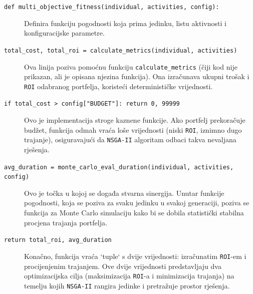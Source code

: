 \begin{description}
    \item[\texttt{def multi\_objective\_fitness(individual, activities, config):}] Definira funkciju pogodnosti koja prima jedinku, listu aktivnosti i konfiguracijske parametre.
    \item[\texttt{total\_cost, total\_roi = calculate\_metrics(individual, activities)}] Ova linija poziva pomoćnu funkciju \texttt{calculate\_metrics} (čiji kod nije prikazan, ali je opisana njezina funkcija). Ona izračunava ukupni trošak i \texttt{ROI} odabranog portfelja, koristeći determinističke vrijednosti.
    \item[\texttt{if total\_cost > config["BUDGET"]: return 0, 99999}] Ovo je implementacija stroge kaznene funkcije. Ako portfelj prekoračuje budžet, funkcija odmah vraća loše vrijednosti (niski \texttt{ROI}, iznimno dugo trajanje), osiguravajući da \texttt{NSGA-II} algoritam odbaci takva nevaljana rješenja.
    \item[\texttt{avg\_duration = monte\_carlo\_eval\_duration(individual, activities, config)}] Ovo je točka u kojoj se događa stvarna sinergija. Unutar funkcije pogodnosti, koja se poziva za svaku jedinku u svakoj generaciji, poziva se funkcija za Monte Carlo simulaciju kako bi se dobila statistički stabilna procjena trajanja portfelja.
    \item[\texttt{return total\_roi, avg\_duration}] Konačno, funkcija vraća `tuple` s dvije vrijednosti: izračunatim \texttt{ROI}-em i procijenjenim trajanjem. Ove dvije vrijednosti predstavljaju dva optimizacijska cilja (maksimizacija \texttt{ROI}-a i minimizacija trajanja) na temelju kojih \texttt{NSGA-II} rangira jedinke i pretražuje prostor rješenja.
\end{description}

